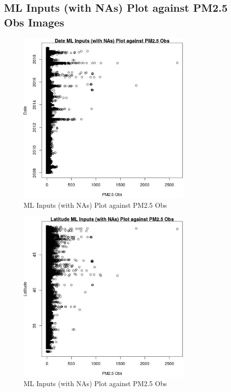 
\subsection{ML Inputs (with NAs) Plot against PM2.5 Obs Images} 
 

\begin{figure} 
\centering  
\includegraphics[width=0.77\textwidth]{Code_Outputs/Report_ML_input_PM25_Step4_part_e_de_duplicated_aveswNAs_DatevPM25_Obs.jpg} 
\caption{\label{fig:Report_ML_input_PM25_Step4_part_e_de_duplicated_aveswNAsDatevPM25_Obs}ML Inputs (with NAs) Plot against PM2.5 Obs} 
\end{figure} 
 

\begin{figure} 
\centering  
\includegraphics[width=0.77\textwidth]{Code_Outputs/Report_ML_input_PM25_Step4_part_e_de_duplicated_aveswNAs_LatitudevPM25_Obs.jpg} 
\caption{\label{fig:Report_ML_input_PM25_Step4_part_e_de_duplicated_aveswNAsLatitudevPM25_Obs}ML Inputs (with NAs) Plot against PM2.5 Obs} 
\end{figure} 
 

